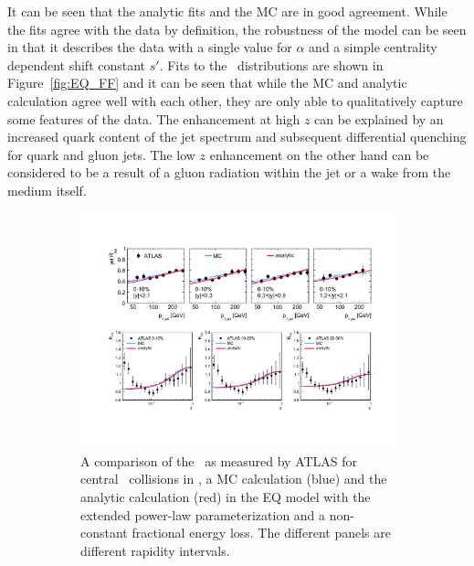 It can be seen that the analytic fits and the MC are in good agreement. While the fits agree with the data by definition, the robustness of the model can be seen in that it describes the data with a single value for $\alpha$ and a simple centrality dependent shift constant $s'$.  Fits to the \Dz\ distributions are shown in Figure~\ref{fig:EQ_FF} and it can be seen that while the MC and analytic calculation agree well with each other, they are only able to qualitatively capture some features of the data. The enhancement at high $z$ can be explained by an increased quark content of the jet spectrum and subsequent differential quenching for quark and gluon jets. The low $z$ enhancement on the other hand can be considered to be a result of a gluon radiation within the jet or a wake from the medium itself.

\begin{figure}
\begin{subfigure}{1\textwidth}
  \centering
\includegraphics[width=1\textwidth]{figures/jetMeasurements/EQ_RAA}
\caption{A comparison of the \RAA\ as measured by ATLAS for central \pbpb\ collisions in \cite{Aad:2014bxa}, a MC calculation (blue) and the analytic calculation (red) in the EQ model with the extended power-law parameterization and a non-constant fractional energy loss. The different panels are different rapidity intervals.}
\label{fig:EQ_RAA}
\end{subfigure} \\ \\ \\
\begin{subfigure}{1\textwidth}
  \centering

\end{subfigure}
\end{figure}

